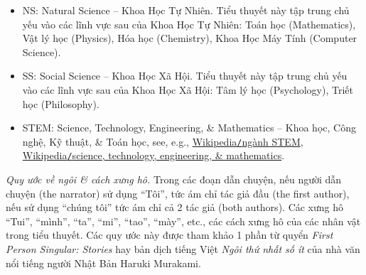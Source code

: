 \documentclass[12pt]{article}
\begin{document}
\begin{itemize}
	\begin{equation}
		P[t;j;\psi;\phi] = P[t;j(t,{\rm env}(t));\psi(t,{\rm env}(t),j(t,{\rm env}(t)));\phi(t,{\rm env}(t),j(t,{\rm env}(t)))].
	\end{equation}
	{\it Cắt nghĩa}: Công việc của 1 người tại 1 thời điểm $t$ (thường sử dụng là tuổi từ đây trở đi nếu không nói gì thêm) phụ thuộc vào môi trường ${\rm env}(t)$ người đó sống, \& cả môi trường sống lẫn công việc của người đó trong môi trường sống đó sẽ có ảnh hưởng đến tâm lý \& hệ giá trị triết học của người đó. Tất cả các biến nghề nghiệp, môi trường, tâm lý, hệ giá trị triết học sẽ thay đổi theo thời gian $t$ \& không gian theo biến ${\bf x}\in{\rm env}(t)$, i.e., khi người đó thay đổi nơi sinh sống học tập, \& làm việc.
	
	Có 1 trường hợp đặc biệt là nếu người đó có hệ giá trị triết học độc lập với môi trường \& công việc, hoặc người đó chỉ sống trong cái đầu của họ thì có thể ký hiệu gọn lại là $\phi(t)$ để chỉ rõ sự độc lập vào công việc \& môi trường. Nhưng chỉ cho phép điều này với phần triết học $\phi(t)$, vì nếu tâm lý $\psi_P(t)$ của 1 người $P$ mà hoàn toàn độc lập với môi trường ${\rm env}_P(t)$ \& công việc $j_P(t)$ thì chắc người đó đã siêu thoát, hoặc nếu còn sống thì cũng đã đạt tới cảnh giới giác ngộ cỡ level niết bàn trong Phật giáo thì có lẽ nên cân nhắc việc phong thánh hoặc sản xuất xá lị{\tt/}xá lợi là vừa. Còn nếu bất cứ yếu tố nào trong 3 yếu tố gồm công việc $j(t)$, tâm lý $\psi(t)$, \& hệ giá trị triết học $\phi(t)$, hoàn toàn độc lập với biến thời gian $t$ thì phải ngó lại lại đối tượng $P$ đang xem xét có phải là con người, hay thậm chí là vật thể sống hay không để tiết kiệm thời gian nghiên cứu \& chuyển sang 1 đối tượng (sống) khác.
	\item NS: Natural Science -- Khoa Học Tự Nhiên. Tiểu thuyết này tập trung chủ yếu vào các lĩnh vực sau của Khoa Học Tự Nhiên: Toán học (Mathematics), Vật lý học (Physics), Hóa học (Chemistry), Khoa Học Máy Tính (Computer Science).
	\item SS: Social Science -- Khoa Học Xã Hội. Tiểu thuyết này tập trung chủ yếu vào các lĩnh vực sau của Khoa Học Xã Hội: Tâm lý học (Psychology), Triết học (Philosophy).
	\item STEM: Science, Technology, Engineering, \& Mathematics -- Khoa học, Công nghệ, Kỹ thuật, \& Toán học, see, e.g., \href{https://vi.wikipedia.org/wiki/Ng%C3%A0nh_STEM}{Wikipedia{\tt/}ngành STEM}, \href{https://en.wikipedia.org/wiki/Science,_technology,_engineering,_and_mathematics}{Wikipedia{\tt/}science, technology, engineering, \& mathematics}.
\end{itemize}
{\it Quy ước về ngôi \& cách xưng hô.} Trong các đoạn dẫn chuyện, nếu người dẫn chuyện (the narrator) sử dụng ``Tôi'', tức ám chỉ tác giả đầu (the first author), nếu sử dụng ``chúng tôi'' tức ám chỉ cả 2 tác giả (both authors). Các xưng hô ``Tui'', ``mình'', ``ta'', ``mi'', ``tao'', ``mày'', etc., các cách xưng hô của các nhân vật trong tiểu thuyết. Các quy ước này được tham khảo 1 phần từ quyển {\it First Person Singular: Stories} \cite{Murakami_1st_person} hay bản dịch tiếng Việt {\it Ngôi thứ nhất số ít} \cite{Murakami_ngoi_1} của nhà văn nổi tiếng người Nhật Bản {\sc Haruki Murakami}.
\end{document}
